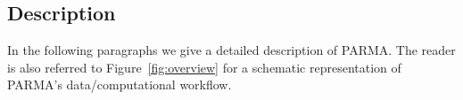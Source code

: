 
\subsection{Description}
In the following paragraphs we give a detailed description of PARMA. The reader
is also referred to Figure~\ref{fig:overview} for a schematic representation of
PARMA's data/computational workflow.

